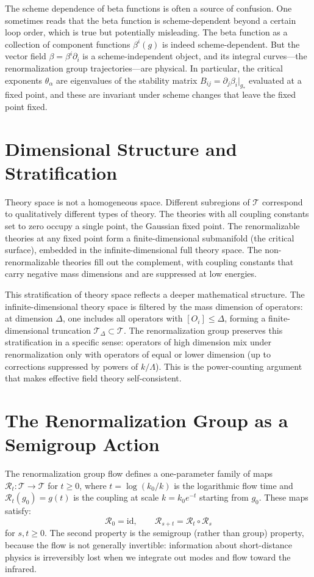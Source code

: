 \documentclass[11pt, twoside, openright]{book}
\theoremstyle{dotted}
\theoremstyle{definition}
\newcommand{\cT}{\mathcal{T}}          %
\begin{document}
The scheme dependence of beta functions is often a source of confusion. One
sometimes reads that the beta function is scheme-dependent beyond a certain loop
order, which is true but potentially misleading. The beta function as a collection
of component functions $\beta^i(g)$ is indeed scheme-dependent. But the vector
field $\beta = \beta^i\partial_i$ is a scheme-independent object, and its integral
curves---the renormalization group trajectories---are physical. In particular, the
critical exponents $\theta_\alpha$ are eigenvalues of the stability matrix $B_{ij}
= \partial_j\beta_i|_{g_*}$ evaluated at a fixed point, and these are invariant
under scheme changes that leave the fixed point fixed.

\section{Dimensional Structure and Stratification}

Theory space is not a homogeneous space. Different subregions of $\cT$
correspond to qualitatively different types of theory. The theories with all
coupling constants set to zero occupy a single point, the Gaussian fixed point.
The renormalizable theories at any fixed point form a finite-dimensional submanifold
(the critical surface), embedded in the infinite-dimensional full theory space.
The non-renormalizable theories fill out the complement, with coupling constants
that carry negative mass dimensions and are suppressed at low energies.

This stratification of theory space reflects a deeper mathematical structure.
The infinite-dimensional theory space is filtered by the mass dimension of
operators: at dimension $\Delta$, one includes all operators with $[O_i] \leq
\Delta$, forming a finite-dimensional truncation $\cT_\Delta \subset \cT$. The
renormalization group preserves this stratification in a specific sense: operators
of high dimension mix under renormalization only with operators of equal or lower
dimension (up to corrections suppressed by powers of $k/\Lambda$). This is the
power-counting argument that makes effective field theory self-consistent.

\section{The Renormalization Group as a Semigroup Action}

The renormalization group flow defines a one-parameter family of maps
$\mathcal{R}_t: \cT \to \cT$ for $t \geq 0$, where $t = \log(k_0/k)$ is the
logarithmic flow time and $\mathcal{R}_t(g_0) = g(t)$ is the coupling at scale
$k = k_0 e^{-t}$ starting from $g_0$. These maps satisfy:
\begin{equation}
  \mathcal{R}_0 = \mathrm{id}, \qquad \mathcal{R}_{s+t} = \mathcal{R}_t \circ \mathcal{R}_s
  \label{eq:rg_semigroup}
\end{equation}
for $s, t \geq 0$. The second property is the semigroup (rather than group) property,
because the flow is not generally invertible: information about short-distance
physics is irreversibly lost when we integrate out modes and flow toward the infrared.
\end{document}
